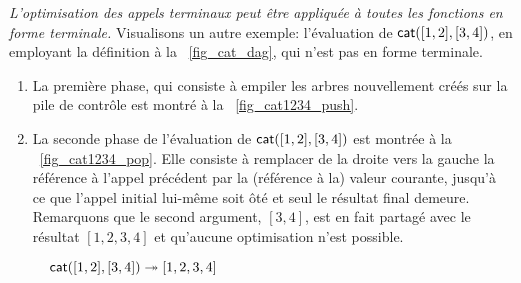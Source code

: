 \emph{L'optimisation des appels terminaux peut être appliquée à toutes
  les fonctions en forme terminale.} Visualisons un autre exemple:
l'évaluation de \(\textsf{cat}([1,2],[3,4])\), en employant la définition
à la \fig~\vref{fig_cat_dag}, qui n'est pas en forme terminale.
\begin{enumerate}

  \item La première phase, qui consiste à empiler les arbres
  nouvellement créés sur la pile de contrôle est montré à la
  \fig~\vref{fig_cat1234_push}.

  \item La seconde phase de l'évaluation de \(\textsf{cat}([1,2],[3,4])\)
  est montrée à la \fig~\vref{fig_cat1234_pop}. Elle consiste à
  remplacer de la droite vers la gauche la référence à l'appel
  précédent par la (référence à la) valeur courante, jusqu'à ce que
  l'appel initial lui-même soit ôté et seul le résultat final
  demeure. Remarquons que le second argument, \([3,4]\), est en fait
  partagé avec le résultat \([1,2,3,4]\) et qu'aucune optimisation
  n'est possible.

\end{enumerate}
\begin{figure}[!t]
\centering
{}
\vskip32pt
{}
\caption{\(\textsf{cat}([1,2],[3,4]) \twoheadrightarrow [1,2,3,4]\)} %
\end{figure}


\label{sec_into_tail_form}

